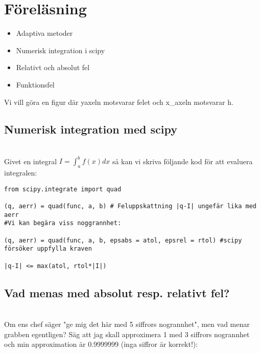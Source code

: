 \section{Föreläsning}

\begin{itemize}
  \item Adaptiva metoder
  \item Numerisk integration i scipy
  \item Relativt och absolut fel
  \item Funktionsfel
\end{itemize}
\par\bigskip
\noindent Vi vill göra en figur där y\-axeln motsvarar felet och x\_axeln motsvarar h.
\par\bigskip

\subsection{Numerisk integration med scipy}\hfill\\

\noindent Givet en integral $I=\int_{a}^{b}f(x)dx$ så kan vi skriva följande kod för att evaluera integralen:
\par\bigskip

\begin{verbatim}
from scipy.integrate import quad

(q, aerr) = quad(func, a, b) # Feluppskattning |q-I| ungefär lika med aerr
#Vi kan begära viss noggrannhet:

(q, aerr) = quad(func, a, b, epsabs = atol, epsrel = rtol) #scipy försöker uppfylla kraven

|q-I| <= max(atol, rtol*|I|)
\end{verbatim}
\par\bigskip

\subsection{Vad menas med absolut resp. relativt fel?}\hfill\\

\noindent Om ens chef säger "ge mig det här med 5 siffrors nogrannhet", men vad menar grabben egentligen? Säg att jag skall approximera 1 med 3 siffrors nogrannhet och min approximation är 0.9999999 (inga siffror är korrekt!):


